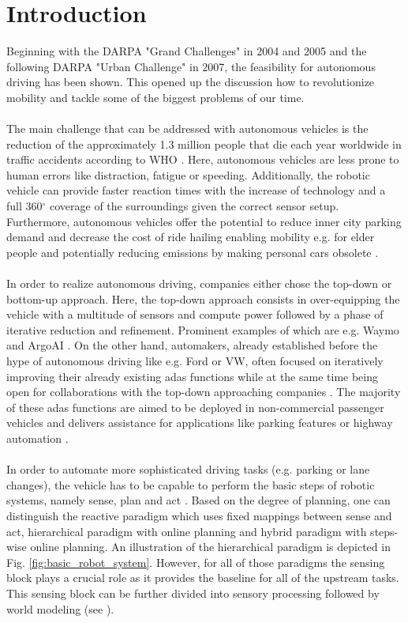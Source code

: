 \chapter{Introduction}
\label{ch:introduction}
Beginning with the DARPA "Grand Challenges" \cite{thrun2006stanley} in 2004 and 2005 and the following DARPA "Urban Challenge" \cite{Urmson-2007-9708} in 2007, the feasibility for autonomous driving has been shown. This opened up the discussion how to revolutionize mobility and tackle some of the biggest problems of our time. 
\\\\
The main challenge that can be addressed with autonomous vehicles is the reduction of the approximately 1.3 million people that die each year worldwide in traffic accidents according to WHO \cite{world2018global}. Here, autonomous vehicles are less prone to human errors like distraction, fatigue or speeding. Additionally, the robotic vehicle can provide faster reaction times with the increase of technology and a full 360$^{\circ}$ coverage of the surroundings given the correct sensor setup. Furthermore, autonomous vehicles offer the potential to reduce inner city parking demand \cite{zhang2020impacts} and decrease the cost of ride hailing enabling mobility e.g. for elder people and potentially reducing emissions by making personal cars obsolete \cite{severino2021autonomous}.  
\\\\
In order to realize autonomous driving, companies either chose the top-down or bottom-up approach. Here, the top-down approach consists in over-equipping the vehicle with a multitude of sensors and compute power followed by a phase of iterative reduction and refinement. Prominent examples of which are e.g. Waymo \cite{sun2020scalability} and ArgoAI \cite{chang2019argoverse}. On the other hand, automakers, already established before the hype of autonomous driving like e.g. Ford or VW, often focused on iteratively improving their already existing \gls{adas} functions while at the same time being open for collaborations with the top-down approaching companies \cite{fordargovw2020}. The majority of these \gls{adas} functions are aimed to be deployed in non-commercial passenger vehicles and delivers assistance for applications like parking features \cite{fordvaletparking2021} or highway automation \cite{fordlanekeeping2021}.
\\\\
In order to automate more sophisticated driving tasks (e.g. parking or lane changes), the vehicle has to be capable to perform the basic steps of robotic systems, namely sense, plan and act \cite{arkin1998behavior}. Based on the degree of planning, one can distinguish the reactive paradigm which uses fixed mappings between sense and act, hierarchical paradigm with online planning and hybrid paradigm with steps-wise online planning. An illustration of the hierarchical paradigm is depicted in Fig. \ref{fig:basic_robot_system}. However, for all of those paradigms the sensing block plays a crucial role as it provides the baseline for all of the upstream tasks. This sensing block can be further divided into sensory processing followed by world modeling (see \cite{arkin1998behavior}).
